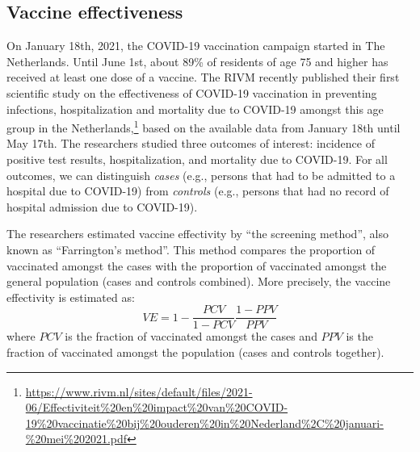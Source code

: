 \subsection{Vaccine effectiveness}

On January 18th, 2021, the COVID-19 vaccination campaign started in The Netherlands.
Until June 1st, about 89\% of residents of age 75 and higher has received at least one dose of a vaccine.
The RIVM recently published their first scientific study on the effectiveness of COVID-19 vaccination in preventing infections, hospitalization and mortality due to COVID-19 amongst this age group in the Netherlands,\footnote{\url{https://www.rivm.nl/sites/default/files/2021-06/Effectiviteit\%20en\%20impact\%20van\%20COVID-19\%20vaccinatie\%20bij\%20ouderen\%20in\%20Nederland\%2C\%20januari-\%20mei\%202021.pdf}}
based on the available data from January 18th until May 17th.
The researchers studied three outcomes of interest: incidence of positive test results, hospitalization, and mortality due to COVID-19. 
For all outcomes, we can distinguish \emph{cases} (e.g., persons that had to be admitted to a hospital due to COVID-19) from \emph{controls} (e.g., persons that had no record of hospital admission due to COVID-19).

The researchers estimated vaccine effectivity by ``the screening method'', also known as ``Farrington's method''.
This method compares the proportion of vaccinated amongst the cases with the proportion of vaccinated amongst the general population (cases and controls combined).
More precisely, the vaccine effectivity is estimated as:
$$VE = 1 - \frac{PCV}{1-PCV} \frac{1-PPV}{PPV}$$
where $PCV$ is the fraction of vaccinated amongst the cases and $PPV$ is the fraction of vaccinated amongst the population (cases and controls together).

